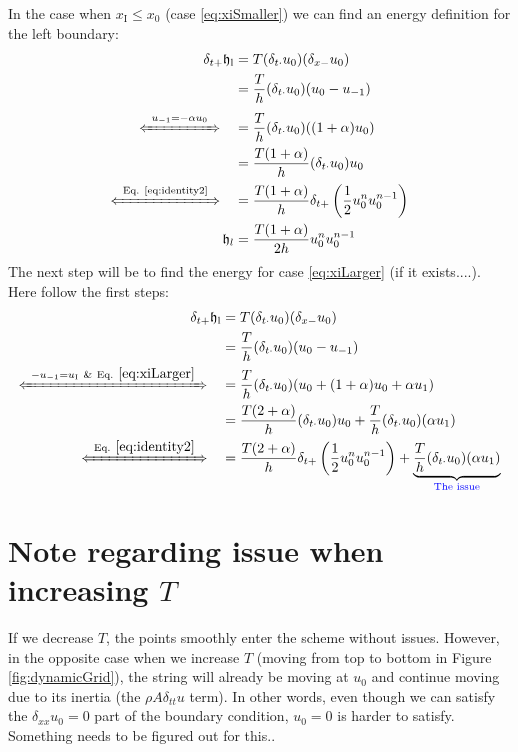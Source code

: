 \documentclass[dvipsnames]{article}
\def\SWcomment[#1]{\textcolor{blue}{#1}}
\def\mystrut{\rule[-.2\baselineskip]{0pt}{\baselineskip}}
\begin{document}
In the case when $x_\text{I} \leq x_0$ (case \eqref{eq:xiSmaller}) we can find an energy definition for the left boundary:
\begin{equation}
    \begin{aligned}
        \delta_{t+}\mathfrak{h}_\text{l} &= T(\delta_{t\cdot}u_0)(\delta_{x-}u_0)\\
        &= \frac{T}{h}(\delta_{t\cdot}u_0)(u_0 - u_{-1})\\[-4pt]
        \xLeftrightarrow{\mystrut\ u_{-1} = -\alpha u_0\ } \quad & = \frac{T}{h}(\delta_{t\cdot}u_0)((1+\alpha)u_0)\\
        &= \frac{T(1+\alpha)}{h}(\delta_{t\cdot}u_0)u_0\\[-5pt]
        \xLeftrightarrow{\mystrut\ \text{Eq. \eqref{eq:identity2}}\ } \quad & = \frac{T(1+\alpha)}{h}\delta_{t+}\left(\frac{1}{2}u_0^nu_0^{n-1}\right)\\
        \mathfrak{h}_l &= \frac{T(1+\alpha)}{2h}u_0^nu_0^{n-1}
    \end{aligned}
\end{equation}
The next step will be to find the energy for case \eqref{eq:xiLarger} (if it exists....). Here follow the first steps:
\begin{equation}
    \begin{aligned}
        \delta_{t+}\mathfrak{h}_\text{l} &= T(\delta_{t\cdot}u_0)(\delta_{x-}u_0)\\
        &= \frac{T}{h}(\delta_{t\cdot}u_0)(u_0 - u_{-1})\\[-5pt]
        \xLeftrightarrow{\mystrut\ -u_{-1} = u_\text{I}\ \text{\&} \ \text{Eq. } \eqref{eq:xiLarger}\ } \quad & = \frac{T}{h}(\delta_{t\cdot}u_0)(u_0 + (1+\alpha) u_0 + \alpha u_1)\\
        &= \frac{T(2+\alpha)}{h}(\delta_{t\cdot}u_0)u_0 + \frac{T}{h}(\delta_{t\cdot}u_0)(\alpha u_1)\\[-5pt]
        \xLeftrightarrow{\mystrut\ \text{Eq. }\eqref{eq:identity2}\ } \quad &= \frac{T(2+\alpha)}{h}\delta_{t+}\left(\frac{1}{2}u_0^nu_0^{n-1}\right) + \underbrace{\frac{T}{h}(\delta_{t\cdot}u_0)(\alpha u_1)}_{\text{\SWcomment[The issue]}} 
    \end{aligned}
\end{equation}



\appendix
\section{Note regarding issue when increasing $T$}\label{app:increasingT}
If we decrease $T$, the points smoothly enter the scheme without issues. However, in the opposite case when we increase $T$ (moving from top to bottom in Figure \ref{fig:dynamicGrid}), the string will already be moving at $u_0$ and continue moving due to its inertia (the $\rho A \delta_{tt}u$ term). In other words, even though we can satisfy the $\delta_{xx}u_0 = 0$ part of the boundary condition, $u_0=0$ is harder to satisfy. Something needs to be figured out for this..
\end{document}

